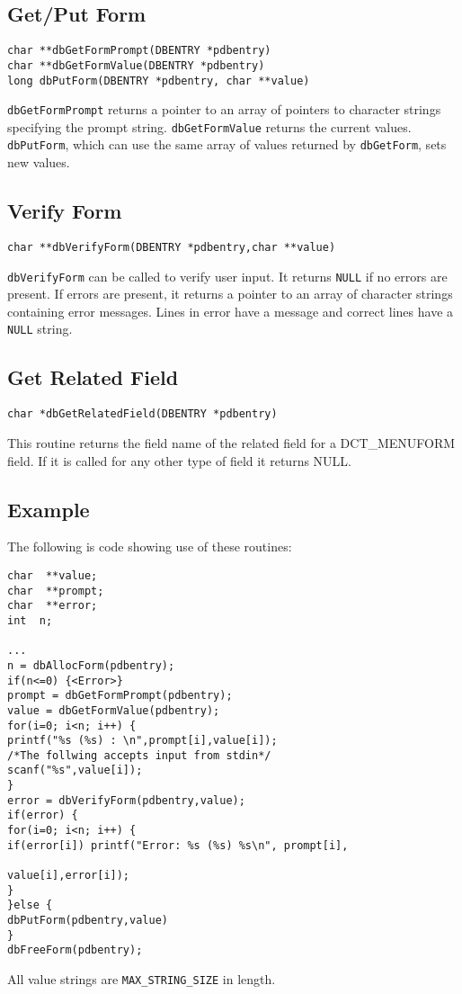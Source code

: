 \subsection{Get/Put Form}

\begin{verbatim}char **dbGetFormPrompt(DBENTRY *pdbentry)
char **dbGetFormValue(DBENTRY *pdbentry)
long dbPutForm(DBENTRY *pdbentry, char **value)
\end{verbatim}
\verb|dbGetFormPrompt| returns a pointer to an array of pointers to character strings specifying the prompt string. 
\verb|dbGetFormValue| returns the current values. \verb|dbPutForm|, which can use the same array of values returned by 
\verb|dbGetForm|, sets new values.

\subsection{Verify Form}

\begin{verbatim}char **dbVerifyForm(DBENTRY *pdbentry,char **value)
\end{verbatim}\verb|dbVerifyForm| can be called to verify user input. It returns \verb|NULL| if no errors are present. If errors are present, it returns 
a pointer to an array of character strings containing error messages. Lines in error have a message and correct lines have a 
\verb|NULL| string.

\subsection{Get Related Field}

\begin{verbatim}char *dbGetRelatedField(DBENTRY *pdbentry)
\end{verbatim}This routine returns the field name of the related field for a DCT\_MENUFORM field. If it is called for any other type of 
field it returns NULL.

\subsection{Example}

The following is code showing use of these routines:

\begin{verbatim}char  **value;
char  **prompt;
char  **error;
int  n;

...
n = dbAllocForm(pdbentry);
if(n<=0) {<Error>}
prompt = dbGetFormPrompt(pdbentry);
value = dbGetFormValue(pdbentry);
for(i=0; i<n; i++) {
printf("%s (%s) : \n",prompt[i],value[i]);
/*The follwing accepts input from stdin*/
scanf("%s",value[i]);
}
error = dbVerifyForm(pdbentry,value);
if(error) {
for(i=0; i<n; i++) {
if(error[i]) printf("Error: %s (%s) %s\n", prompt[i],

value[i],error[i]);
}
}else {
dbPutForm(pdbentry,value)
}
dbFreeForm(pdbentry);
\end{verbatim}All value strings are \verb|MAX_STRING_SIZE| in length.

